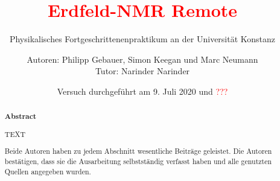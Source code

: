 \title{\textcolor{red}{Erdfeld-NMR Remote}}
\subtitle{Physikalisches Fortgeschrittenenpraktikum an der Universität Konstanz}
\author{Autoren: Philipp Gebauer, Simon Keegan und Marc Neumann \\ \large{Tutor: Narinder Narinder}}
\date{Versuch durchgeführt am 9. Juli 2020 und \textcolor{red}{???}}
\maketitle
\begin{abstract}
    \begin{center}
        \Large{\textsf{\textbf{Abstract}}}
    \end{center}
    \vspace{0.75 cm}
    \begin{singlespace}
    \noindent TEXT
    \vspace{0.75 cm}
     
    \noindent Beide Autoren haben zu jedem Abschnitt wesentliche Beiträge geleistet. Die Autoren bestätigen, dass sie die Ausarbeitung selbstständig verfasst haben und alle genutzten Quellen angegeben wurden.

\end{singlespace}
\end{abstract}

\thispagestyle{empty}
\newpage